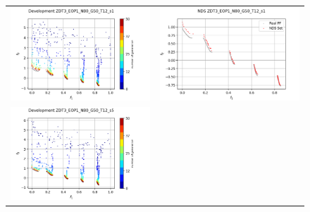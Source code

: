 \begin{figure}[H]
    \centering
    \begin{tabular}{c c}
    \includegraphics[scale=0.5]{figures/ZDT3_EOP1_N80_G50_T12/s1_dev.png} &
    \includegraphics[scale=0.5]{figures/ZDT3_EOP1_N80_G50_T12/s1_nds.png}\\
    \includegraphics[scale=0.5]{figures/ZDT3_EOP1_N80_G50_T12/s5_dev.png} &

\end{tabular}
\end{figure}
